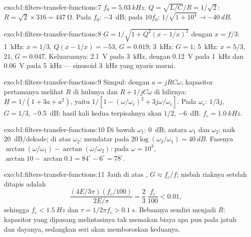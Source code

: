 \begin{solution}{exo:b1:filters-transfer-functions:7}
$f_0 = \qty{5.03}{kHz}$. $Q = \sqrt{L/C}/R = 1/\sqrt2$: $R = \sqrt2 \times
316 = \qty{447}{\ohm}$. Pada $f_0$: \qty{-3}{dB}; pada $10f_0$: $1/\sqrt{1 +
10^4} \to \qty{-40}{dB}$.
\end{solution}

\begin{solution}{exo:b1:filters-transfer-functions:8}
$G = 1/\sqrt{1 + Q^2(x - 1/x)^2}$ dengan $x = f/3$: \qty{1}{kHz}: $x = 1/3$,
$Q(x - 1/x) = -53$, $G = 0.019$; \qty{3}{kHz}: $G = 1$; \qty{5}{kHz}:
$x = 5/3$, $21$, $G = 0.047$. Keluarannya: \qty{2.1}{V} pada \qty{3}{kHz},
dengan \qty{0.12}{V} pada \qty{1}{kHz} dan \qty{0.06}{V} pada \qty{5}{kHz} ---
sinusoid \qty{3}{kHz} yang nyaris murni.
\end{solution}

\begin{solution}{exo:b1:filters-transfer-functions:9}
Simpul: dengan $a = jRC\omega$, kapasitor pertamanya melihat $R$ di
hulunya dan $R + 1/jC\omega$ di hilirnya: $\underline H = 1/(1 + 3a + a^2)$, yaitu
$1/[1 - (\omega/\omega_c)^2 + 3j\omega/\omega_c]$. Pada $\omega_c$: $1/3j$,
$G = 1/3$, \qty{-9.5}{dB}; hasil kali kedua  terpisahnya akan
$1/2$, \qty{-6}{dB}. $f_c = \qty{1.0}{kHz}$.
\end{solution}

\begin{solution}{exo:b1:filters-transfer-functions:10}
Di bawah $\omega_1$: \qty{0}{dB}; antara $\omega_1$ dan $\omega_2$: naik
\qty{20}{dB/dekade}; di atas $\omega_2$: mendatar pada $20\log(\omega_2/\omega_1) =
\qty{40}{dB}$. Fasenya $\arctan(\omega/\omega_1) - \arctan(\omega/\omega_2)$:
pada $\omega = 10^3$, $\arctan 10 - \arctan 0.1 = 84^\circ - 6^\circ =
78^\circ$.
\end{solution}

\begin{solution}{exo:b1:filters-transfer-functions:11}
Jauh di atas , $G \approx f_c/f$; nisbah riaknya
setelah ditapis adalah
\[
\frac{(4E/3\pi)(f_c/100)}{2E/\pi} = \frac{2}{3}\,\frac{f_c}{100} < 0.01,
\]
sehingga $f_c < \qty{1.5}{Hz}$ dan $\tau = 1/2\pi f_c > \qty{0.1}{s}$. Bebannya sendiri menjadi
$R$: kapasitor yang dipasang melintasinya tak memakan biaya apa pun pada
jatuh  dan dayanya, sedangkan  seri akan memboroskan keduanya.
\end{solution}

